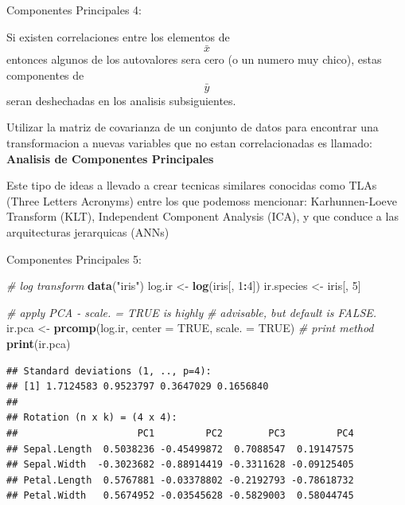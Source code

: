 \documentclass[ignorenonframetext,]{beamer}
\newenvironment{Shaded}{\begin{snugshade}}{\end{snugshade}}
\newcommand{\KeywordTok}[1]{\textcolor[rgb]{0.13,0.29,0.53}{\textbf{#1}}}
\newcommand{\DataTypeTok}[1]{\textcolor[rgb]{0.13,0.29,0.53}{#1}}
\newcommand{\DecValTok}[1]{\textcolor[rgb]{0.00,0.00,0.81}{#1}}
\newcommand{\StringTok}[1]{\textcolor[rgb]{0.31,0.60,0.02}{#1}}
\newcommand{\CommentTok}[1]{\textcolor[rgb]{0.56,0.35,0.01}{\textit{#1}}}
\newcommand{\OtherTok}[1]{\textcolor[rgb]{0.56,0.35,0.01}{#1}}
\newcommand{\OperatorTok}[1]{\textcolor[rgb]{0.81,0.36,0.00}{\textbf{#1}}}
\newcommand{\NormalTok}[1]{#1}
\begin{document}
\begin{frame}

\begin{block}{Componentes Principales 4:}

Si existen correlaciones entre los elementos de \[\bar{x}\] entonces
algunos de los autovalores sera cero (o un numero muy chico), estas
componentes de \[\bar{y}\] seran deshechadas en los analisis
subsiguientes.

Utilizar la matriz de covarianza de un conjunto de datos para encontrar
una transformacion a nuevas variables que no estan correlacionadas es
llamado: \textbf{Analisis de Componentes Principales}

Este tipo de ideas a llevado a crear tecnicas similares conocidas como
TLAs (Three Letters Acronyms) entre los que podemoss mencionar:
Karhunnen-Loeve Transform (KLT), Independent Component Analysis (ICA), y
que conduce a las arquitecturas jerarquicas (ANNs)

\end{block}

\end{frame}

\begin{frame}[fragile]

\begin{block}{Componentes Principales 5:}

\begin{Shaded}
\begin{Highlighting}[]
\CommentTok{# log transform}
\KeywordTok{data}\NormalTok{(}\StringTok{"iris"}\NormalTok{)}
\NormalTok{log.ir <-}\StringTok{ }\KeywordTok{log}\NormalTok{(iris[, }\DecValTok{1}\OperatorTok{:}\DecValTok{4}\NormalTok{])}
\NormalTok{ir.species <-}\StringTok{ }\NormalTok{iris[, }\DecValTok{5}\NormalTok{]}
 
\CommentTok{# apply PCA - scale. = TRUE is highly }
\CommentTok{# advisable, but default is FALSE. }
\NormalTok{ir.pca <-}\StringTok{ }\KeywordTok{prcomp}\NormalTok{(log.ir, }\DataTypeTok{center =} \OtherTok{TRUE}\NormalTok{, }\DataTypeTok{scale. =} \OtherTok{TRUE}\NormalTok{) }
\CommentTok{# print method}
\KeywordTok{print}\NormalTok{(ir.pca)}
\end{Highlighting}
\end{Shaded}

\begin{verbatim}
## Standard deviations (1, .., p=4):
## [1] 1.7124583 0.9523797 0.3647029 0.1656840
## 
## Rotation (n x k) = (4 x 4):
##                     PC1         PC2        PC3         PC4
## Sepal.Length  0.5038236 -0.45499872  0.7088547  0.19147575
## Sepal.Width  -0.3023682 -0.88914419 -0.3311628 -0.09125405
## Petal.Length  0.5767881 -0.03378802 -0.2192793 -0.78618732
## Petal.Width   0.5674952 -0.03545628 -0.5829003  0.58044745
\end{verbatim}

\end{block}

\end{frame}
\end{document}
